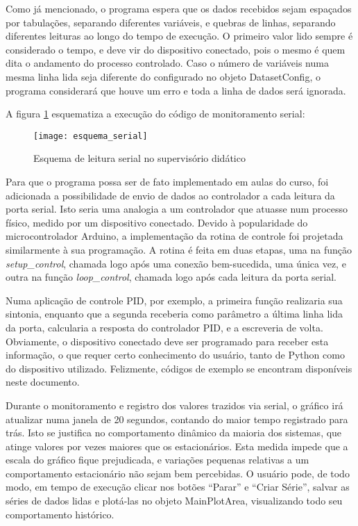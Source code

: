 Como já mencionado, o programa espera que os dados recebidos sejam espaçados por tabulações, separando diferentes variáveis, e quebras de linhas, separando diferentes leituras ao longo do tempo de execução. O primeiro valor lido sempre é considerado o tempo, e deve vir do dispositivo conectado, pois o mesmo é quem dita o andamento do processo controlado. Caso o número de variáveis numa mesma linha lida seja diferente do configurado no objeto DatasetConfig, o programa considerará que houve um erro e toda a linha de dados será ignorada.

A figura \ref{img_esquema_serial} esquematiza a execução do código de monitoramento serial:

\begin{figure}[hbt]
	\centering
	\texttt{[image: esquema\_serial]}
	\caption{Esquema de leitura serial no supervisório didático}
	\label{img_esquema_serial}
\end{figure}

Para que o programa possa ser de fato implementado em aulas do curso, foi adicionada a possibilidade de envio de dados ao controlador a cada leitura da porta serial. Isto seria uma analogia a um controlador que atuasse num processo físico, medido por um dispositivo conectado. Devido à popularidade do microcontrolador Arduino, a implementação da rotina de controle foi projetada similarmente à sua programação. A rotina é feita em duas etapas, uma na função \emph{setup\_control}, chamada logo após uma conexão bem-sucedida, uma única vez, e outra na função \emph{loop\_control}, chamada logo após cada leitura da porta serial.

Numa aplicação de controle PID, por exemplo, a primeira função realizaria sua sintonia, enquanto que a segunda receberia como parâmetro a última linha lida da porta, calcularia a resposta do controlador PID, e a escreveria de volta. Obviamente, o dispositivo conectado deve ser programado para receber esta informação, o que requer certo conhecimento do usuário, tanto de Python como do dispositivo utilizado. Felizmente, códigos de exemplo se encontram disponíveis neste documento.

Durante o monitoramento e registro dos valores trazidos via serial, o gráfico irá atualizar numa janela de 20 segundos, contando do maior tempo registrado para trás. Isto se justifica no comportamento dinâmico da maioria dos sistemas, que atinge valores por vezes maiores que os estacionários. Esta medida impede que a escala do gráfico fique prejudicada, e variações pequenas relativas a um comportamento estacionário não sejam bem percebidas. O usuário pode, de todo modo, em tempo de execução clicar nos botões “Parar” e “Criar Série”, salvar as séries de dados lidas e plotá-las no objeto MainPlotArea, visualizando todo seu comportamento histórico.

